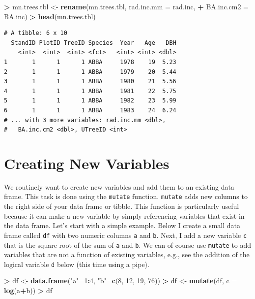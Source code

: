 \documentclass[]{krantz}
\makeatletter
\newenvironment{Shaded}{\begin{snugshade}}{\end{snugshade}}
\newcommand{\KeywordTok}[1]{\textcolor[rgb]{0.27,0.27,0.27}{\textbf{#1}}}
\newcommand{\DataTypeTok}[1]{\textcolor[rgb]{0.27,0.27,0.27}{#1}}
\newcommand{\DecValTok}[1]{\textcolor[rgb]{0.06,0.06,0.06}{#1}}
\newcommand{\StringTok}[1]{\textcolor[rgb]{0.5,0.5,0.5}{#1}}
\newcommand{\OperatorTok}[1]{\textcolor[rgb]{0.43,0.43,0.43}{\textbf{#1}}}
\newcommand{\NormalTok}[1]{#1}
\newenvironment{kframe}{%
\medskip{}
\setlength{\fboxsep}{.8em}
 \def\at@end@of@kframe{}%
 \ifinner\ifhmode%
  \def\at@end@of@kframe{\end{minipage}}%
  \begin{minipage}{\columnwidth}%
 \fi\fi%
 \def\FrameCommand##1{\hskip\@totalleftmargin \hskip-\fboxsep
 \colorbox{shadecolor}{##1}\hskip-\fboxsep
     \hskip-\linewidth \hskip-\@totalleftmargin \hskip\columnwidth}%
 \MakeFramed {\advance\hsize-\width
   \@totalleftmargin\z@ \linewidth\hsize
   \@setminipage}}%
 {\par\unskip\endMakeFramed%
 \at@end@of@kframe}
\renewenvironment{Shaded}{\begin{kframe}}{\end{kframe}}
\theoremstyle{definition}
\theoremstyle{definition}
\theoremstyle{definition}
\theoremstyle{remark}
\makeatother
\begin{document}
\begin{Shaded}
\begin{Highlighting}[]
\OperatorTok{>}\StringTok{ }\NormalTok{mn.trees.tbl <-}\StringTok{ }\KeywordTok{rename}\NormalTok{(mn.trees.tbl, }\DataTypeTok{rad.inc.mm =}\NormalTok{ rad.inc, }
\OperatorTok{+}\StringTok{                        }\DataTypeTok{BA.inc.cm2 =}\NormalTok{ BA.inc)}
\OperatorTok{>}\StringTok{ }\KeywordTok{head}\NormalTok{(mn.trees.tbl)}
\end{Highlighting}
\end{Shaded}

\begin{verbatim}
# A tibble: 6 x 10
  StandID PlotID TreeID Species  Year   Age   DBH
    <int>  <int>  <int> <fct>   <int> <int> <dbl>
1       1      1      1 ABBA     1978    19  5.23
2       1      1      1 ABBA     1979    20  5.44
3       1      1      1 ABBA     1980    21  5.56
4       1      1      1 ABBA     1981    22  5.75
5       1      1      1 ABBA     1982    23  5.99
6       1      1      1 ABBA     1983    24  6.24
# ... with 3 more variables: rad.inc.mm <dbl>,
#   BA.inc.cm2 <dbl>, UTreeID <int>
\end{verbatim}

\section{Creating New Variables}\label{creating-new-variables}

We routinely want to create new variables and add them to an existing
data frame. This task is done using the \texttt{mutate} function.
\texttt{mutate} adds new columns to the right side of your data frame or
tibble. This function is particularly useful because it can make a new
variable by simply referencing variables that exist in the data frame.
Let's start with a simple example. Below I create a small data frame
called \texttt{df} with two numeric columns \texttt{a} and \texttt{b}.
Next, I add a new variable \texttt{c} that is the square root of the sum
of \texttt{a} and \texttt{b}. We can of course use \texttt{mutate} to
add variables that are not a function of existing variables, e.g., see
the addition of the logical variable \texttt{d} below (this time using a
pipe).

\begin{Shaded}
\begin{Highlighting}[]
\OperatorTok{>}\StringTok{ }\NormalTok{df <-}\StringTok{ }\KeywordTok{data.frame}\NormalTok{(}\StringTok{"a"}\NormalTok{=}\DecValTok{1}\OperatorTok{:}\DecValTok{4}\NormalTok{, }\StringTok{"b"}\NormalTok{=}\KeywordTok{c}\NormalTok{(}\DecValTok{8}\NormalTok{, }\DecValTok{12}\NormalTok{, }\DecValTok{19}\NormalTok{, }\DecValTok{76}\NormalTok{))}
\OperatorTok{>}\StringTok{ }\NormalTok{df <-}\StringTok{ }\KeywordTok{mutate}\NormalTok{(df, }\DataTypeTok{c =} \KeywordTok{log}\NormalTok{(a}\OperatorTok{+}\NormalTok{b))}
\OperatorTok{>}\StringTok{ }\NormalTok{df}
\end{Highlighting}
\end{Shaded}
\end{document}
